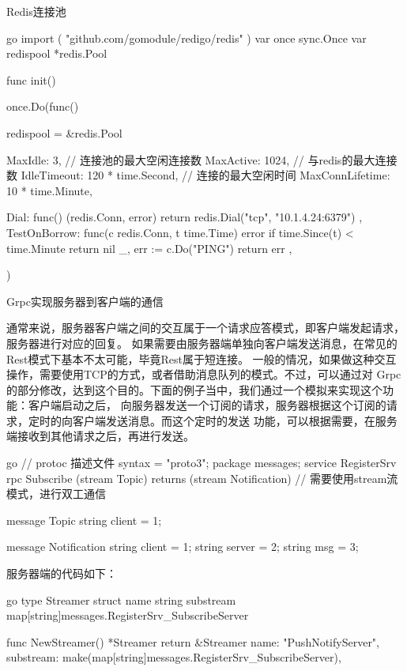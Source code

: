 \begin{outline}[enumerate]
  \1 Redis连接池
\begin{code-block}{go}
import (
    "github.com/gomodule/redigo/redis"
)
var once sync.Once
var redispool *redis.Pool

func init() {
    once.Do(func() {
        redispool = &redis.Pool{
            MaxIdle:         3,                 // 连接池的最大空闲连接数
            MaxActive:       1024,              // 与redis的最大连接数
            IdleTimeout:     120 * time.Second, // 连接的最大空闲时间
            MaxConnLifetime: 10 * time.Minute,

            Dial: func() (redis.Conn, error) {
                return redis.Dial("tcp", "10.1.4.24:6379")
            },
            TestOnBorrow: func(c redis.Conn, t time.Time) error {
                if time.Since(t) < time.Minute {
                    return nil
                }
                _, err := c.Do("PING")
                return err
            },
        }
    })
}
\end{code-block}

  \1 Grpc实现服务器到客户端的通信

  通常来说，服务器客户端之间的交互属于一个请求应答模式，即客户端发起请求，服务器进行对应的回复。
  如果需要由服务器端单独向客户端发送消息，在常见的Rest模式下基本不太可能，毕竟Rest属于短连接。
  一般的情况，如果做这种交互操作，需要使用TCP的方式，或者借助消息队列的模式。不过，可以通过对
  Grpc的部分修改，达到这个目的。下面的例子当中，我们通过一个模拟来实现这个功能：客户端启动之后，
  向服务器发送一个订阅的请求，服务器根据这个订阅的请求，定时的向客户端发送消息。而这个定时的发送
  功能，可以根据需要，在服务端接收到其他请求之后，再进行发送。
\begin{code-block}{go}
// protoc 描述文件
syntax = "proto3";
package messages;
service RegisterSrv{
    rpc Subscribe (stream Topic) returns (stream Notification) {} // 需要使用stream流模式，进行双工通信
}

message Topic {
    string client = 1;
}

message Notification {
    string client = 1;
    string server = 2;
    string msg = 3;
}
\end{code-block}

  服务器端的代码如下：
\begin{code-block}{go}
type Streamer struct {
    name      string
    substream map[string]messages.RegisterSrv_SubscribeServer
}

func NewStreamer() *Streamer {
    return &Streamer{
        name:      "PushNotifyServer",
        substream: make(map[string]messages.RegisterSrv_SubscribeServer),
    }
}


\end{code-block}
\end{outline}
